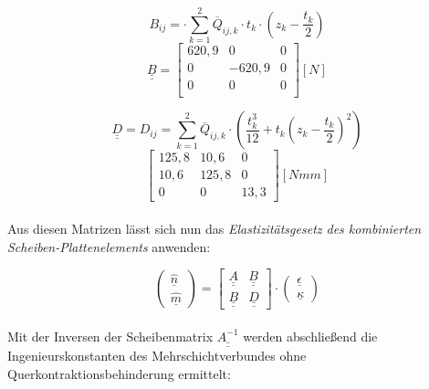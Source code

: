 \begin{equation}
	B_{ij}= \cdot \sum_{k=1}^{2} \overline{Q}_{ij,k}\cdot t_{k}\cdot \left(z_{k}-\frac{t_{k}}{2}\right)
\end{equation}
\begin{equation} \underline{\underline{B}}=
	\begin{bmatrix}
		620,9 & 0 & 0\\
		0 & -620,9 & 0\\	
		0 & 0 & 0\\
	\end{bmatrix} [N]
\end{equation}

\begin{equation} \underline{\underline{D}}=
	D_{ij}=\sum_{k=1}^{2} \overline{Q}_{ij,k}\cdot \left(\frac{t_{k}^{3}}{12}+t_{k}\left(z_{k}-\frac{t_{k}}{2}\right)^{2}\right)
\end{equation}
\begin{equation}
	\begin{bmatrix}
		125,8 & 10,6 & 0\\
		10,6 & 125,8 & 0\\
		0 & 0 & 13,3
	\end{bmatrix} [Nmm]
\end{equation}\\

\noindent Aus diesen Matrizen lässt sich nun das \textit{ Elastizitätsgesetz des kombinierten Scheiben-Plattenelements} anwenden:

\begin{equation}
	\begin{pmatrix}
		\hat{\underline{n}}\\
		\hat{\underline{m}}
	\end{pmatrix}
	= \begin{bmatrix}
		\underline{\underline{A}}&\underline{\underline{B}}\\
		\underline{\underline{B}}&\underline{\underline{D}}
	\end{bmatrix}
	\cdot \begin{pmatrix}
		\underline{\epsilon}\\
		\underline{\kappa}
	\end{pmatrix}
\end{equation}\\

\noindent Mit der Inversen der Scheibenmatrix $\underline{\underline{A^{-1}}}$ werden abschließend die Ingenieurskonstanten des Mehrschichtverbundes ohne Querkontraktionsbehinderung ermittelt:

